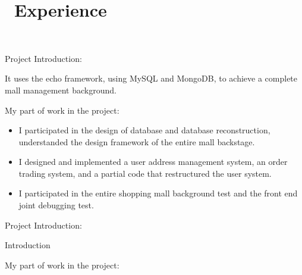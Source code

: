 \documentclass{resume}
\begin{document}
\section{\faUsers\ Experience} \vspace{1mm}

\faLink\ 

\vspace{1mm}\par
\noindent
Project Introduction:

\vspace{1mm}\par
\setlength{\parindent}{2ex}
It uses the echo framework, using MySQL and MongoDB, to achieve a complete mall
 management background.

\vspace{1mm}\par
\noindent
My part of work in the project:

\begin{itemize}[parsep=1ex]
  \item I participated in the design of database and database reconstruction,
   understanded the design framework of the entire mall backstage.
  \item I designed and implemented a user address management system, an order
   trading system, and a partial code that restructured the user system.
  \item I participated in the entire shopping mall background test and the front
   end joint debugging test.
\end{itemize}


\vspace{1mm}\par
\noindent
Project Introduction:

\vspace{1mm}\par
\setlength{\parindent}{2ex}
Introduction

\vspace{1mm}\par
\noindent
My part of work in the project:
\end{document}
